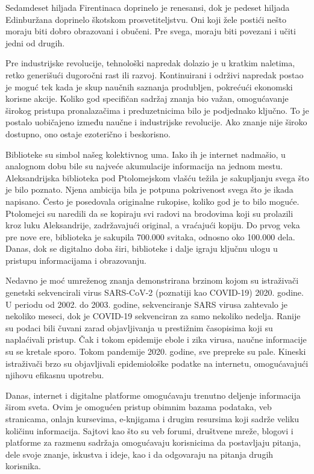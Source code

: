 \documentclass{article}
\begin{document}
Sedamdeset hiljada Firentinaca doprinelo je renesansi, dok je pedeset hiljada Edinburžana doprinelo škotskom prosvetiteljstvu. Oni koji žele postići nešto moraju biti dobro obrazovani i obučeni\cite{baldwin2023athena}. Pre svega, moraju biti povezani i učiti jedni od drugih.

Pre industrijske revolucije, tehnološki napredak dolazio je u kratkim naletima, retko generišući dugoročni rast ili razvoj. Kontinuirani i održivi napredak postao je moguć tek kada je skup naučnih saznanja produbljen, pokrećući ekonomski korisne akcije. Koliko god specifičan sadržaj znanja bio važan, omogućavanje širokog pristupa pronalazačima i preduzetnicima bilo je podjednako ključno. To je postalo uobičajeno između naučne i industrijske revolucije. Ako znanje nije široko dostupno, ono ostaje ezoterično i beskorisno.

Biblioteke su simbol našeg kolektivnog uma. Iako ih je internet nadmašio, u analognom dobu bile su najveće akumulacije informacija na jednom mestu. Aleksandrijska biblioteka pod Ptolomejskom vlašću težila je sakupljanju svega što je bilo poznato. Njena ambicija bila je potpuna pokrivenost svega što je ikada napisano. Često je posedovala originalne rukopise, koliko god je to bilo moguće. Ptolomejci su naredili da se kopiraju svi radovi na brodovima koji su prolazili kroz luku Aleksandrije, zadržavajući original, a vraćajući kopiju\cite{barnes2010cloistered}. Do prvog veka pre nove ere, biblioteka je sakupila 700.000 svitaka, odnosno oko 100.000 dela. Danas, dok se digitalno doba širi, biblioteke i dalje igraju ključnu ulogu u pristupu informacijama i obrazovanju.

Nedavno je moć umreženog znanja demonstrirana brzinom kojom su istraživači genetski sekvencirali virus SARS-CoV-2 (poznatiji kao COVID-19) 2020. godine. U periodu od 2002. do 2003. godine, sekvenciranje SARS virusa zahtevalo je nekoliko meseci, dok je COVID-19 sekvenciran za samo nekoliko nedelja\cite{baldwin2023athena}. Ranije su podaci bili čuvani zarad objavljivanja u prestižnim časopisima koji su naplaćivali pristup. Čak i tokom epidemije ebole i zika virusa, naučne informacije su se kretale sporo. Tokom pandemije 2020. godine, sve prepreke su pale. Kineski istraživači brzo su objavljivali epidemiološke podatke na internetu, omogućavajući njihovu efikasnu upotrebu.

Danas, internet i digitalne platforme omogućavaju trenutno deljenje informacija širom sveta. Ovim je omogućen pristup obimnim bazama podataka, veb stranicama, onlajn kursevima, e-knjigama i drugim resursima koji sadrže veliku količinu informacija. Sajtovi kao što su veb forumi, društvene mreže, blogovi i platforme za razmenu sadržaja omogućavaju korisnicima da postavljaju pitanja, dele svoje znanje, iskustva i ideje, kao i da odgovaraju na pitanja drugih korisnika.
\end{document}
